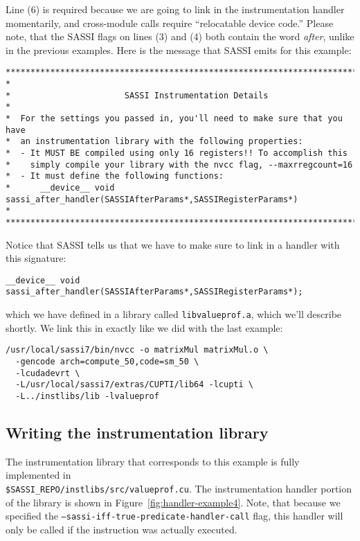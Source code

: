 Line (6) is required because we are going to link in the
instrumentation handler momentarily, and cross-module calls require
``relocatable device code.''  Please note, that the SASSI flags on
lines (3) and (4) both contain the word \emph{after}, unlike in the
previous examples.  Here is the message that SASSI emits for this
example:
\begin{verbatim}
******************************************************************************
*
*                       SASSI Instrumentation Details
*
*  For the settings you passed in, you'll need to make sure that you have
*  an instrumentation library with the following properties:
*  - It MUST BE compiled using only 16 registers!! To accomplish this
*    simply compile your library with the nvcc flag, --maxrregcount=16
*  - It must define the following functions:
*      __device__ void sassi_after_handler(SASSIAfterParams*,SASSIRegisterParams*)
*
******************************************************************************
\end{verbatim}

Notice that SASSI tells us that we have to make sure to link in a
handler with this signature:
\begin{lstlisting}
__device__ void sassi_after_handler(SASSIAfterParams*,SASSIRegisterParams*);
\end{lstlisting}
which we have defined in a library called \texttt{libvalueprof.a}, which
we'll describe shortly.  We link this in exactly like we did with the
last example:
\begin{lstlisting}[style=BashInputStyle]
/usr/local/sassi7/bin/nvcc -o matrixMul matrixMul.o \
  -gencode arch=compute_50,code=sm_50 \
  -lcudadevrt \
  -L/usr/local/sassi7/extras/CUPTI/lib64 -lcupti \
  -L../instlibs/lib -lvalueprof
\end{lstlisting}

\subsection{Writing the instrumentation library}

The instrumentation library that corresponds to this example is fully
implemented in \\ \texttt{\$SASSI\_REPO/instlibs/src/valueprof.cu}.  The
instrumentation handler portion of the library is shown in
Figure~\ref{fig:handler-example4}.  Note, that because we specified
the \texttt{--sassi-iff-true-predicate-handler-call} flag, this
handler will only be called if the instruction was actually executed.

